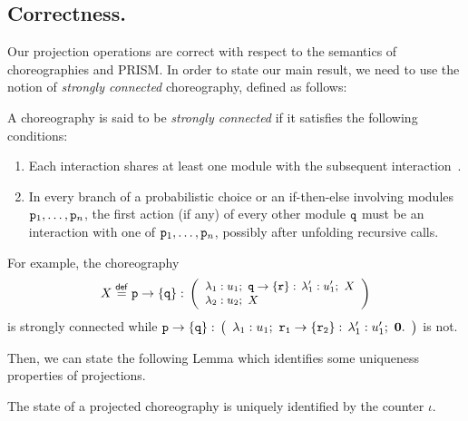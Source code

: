 \subsection{Correctness.} Our projection operations are correct with
respect to the semantics of choreographies and PRISM.
%
In order to state our main result, we need to use the notion of {\em
  strongly connected} choreography, defined as follows:
%
\begin{definition}
  A choreography is said to be \emph{strongly connected} if it satisfies the following conditions:
  \begin{enumerate}
  \item Each interaction shares at least one module with the
    subsequent interaction~\cite{CHY12}.
      \item In every branch of a probabilistic choice or an if-then-else involving modules $\mathtt{p}_1, \ldots, \mathtt{p}_n$, the first action (if any) of every other module $\mathtt{q}$ must be an interaction with one of $\mathtt{p}_1, \ldots, \mathtt{p}_n$, possibly after unfolding recursive calls.
  \end{enumerate}
\end{definition}

%
%
%

For example, the choreography
\begin{displaymath}\small
  X\stackrel{\mathsf{def}}{=} 
  \mathtt{p}\rightarrow \{\mathtt{q}\}:\,
  \left(
    \begin{array}{l}
      \lambda_1: u_1;\ \mathtt{q}\rightarrow \{\mathtt{r}\}:\, \lambda_1':u_1';\ X    \\
      \lambda_2: u_2;\ X
    \end{array}
  \right)
\end{displaymath}
%
is strongly connected while 
% 
$%
\interactBase{p}{q}:\,
\left(
  \begin{array}{l}
    \lambda_1: u_1;\ \interactBase{r_1}{r_2}:\, \lambda_1':u_1';\ \CEnd.
  \end{array}
\right) $ is not.
% 

Then, we can state the following Lemma which identifies some
uniqueness properties of projections. 
\begin{lemma}
  The state of a projected choreography is uniquely identified by the
  counter $\iota$.
\end{lemma}

